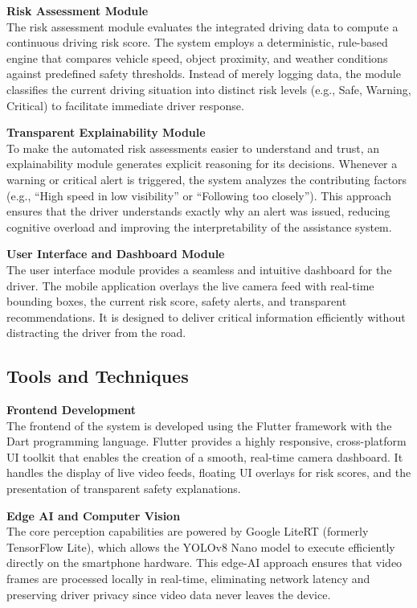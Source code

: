 \vspace{0.5em}
\noindent\textbf{Risk Assessment Module}\\
The risk assessment module evaluates the integrated driving data to compute a continuous driving risk score. The system employs a deterministic, rule-based engine that compares vehicle speed, object proximity, and weather conditions against predefined safety thresholds. Instead of merely logging data, the module classifies the current driving situation into distinct risk levels (e.g., Safe, Warning, Critical) to facilitate immediate driver response.

\vspace{0.5em}
\noindent\textbf{Transparent Explainability Module}\\
To make the automated risk assessments easier to understand and trust, an explainability module generates explicit reasoning for its decisions. Whenever a warning or critical alert is triggered, the system analyzes the contributing factors (e.g., ``High speed in low visibility'' or ``Following too closely''). This approach ensures that the driver understands exactly why an alert was issued, reducing cognitive overload and improving the interpretability of the assistance system.

\vspace{0.5em}
\noindent\textbf{User Interface and Dashboard Module}\\
The user interface module provides a seamless and intuitive dashboard for the driver. The mobile application overlays the live camera feed with real-time bounding boxes, the current risk score, safety alerts, and transparent recommendations. It is designed to deliver critical information efficiently without distracting the driver from the road. 

\subsection{Tools and Techniques}

\noindent\textbf{Frontend Development}\\
The frontend of the system is developed using the Flutter framework with the Dart programming language. Flutter provides a highly responsive, cross-platform UI toolkit that enables the creation of a smooth, real-time camera dashboard. It handles the display of live video feeds, floating UI overlays for risk scores, and the presentation of transparent safety explanations.

\vspace{0.5em}
\noindent\textbf{Edge AI and Computer Vision}\\
The core perception capabilities are powered by Google LiteRT (formerly TensorFlow Lite), which allows the YOLOv8 Nano model to execute efficiently directly on the smartphone hardware. This edge-AI approach ensures that video frames are processed locally in real-time, eliminating network latency and preserving driver privacy since video data never leaves the device.

